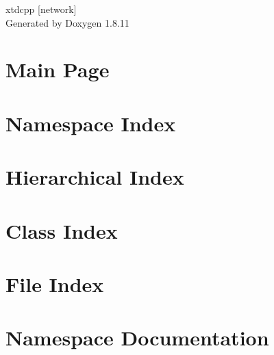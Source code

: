 \documentclass[twoside]{book}
\newcommand{\+}{\discretionary{\mbox{\scriptsize$\hookleftarrow$}}{}{}}
\newcommand{\clearemptydoublepage}{%
  \newpage{\pagestyle{empty}\cleardoublepage}%
}
\begin{document}
\hypersetup{pageanchor=false,
             bookmarksnumbered=true,
             pdfencoding=unicode
            }
\begin{titlepage}
\vspace*{7cm}
\begin{center}%
{\Large xtdcpp \mbox{[}network\mbox{]} }\\
\vspace*{1cm}
{\large Generated by Doxygen 1.8.11}\\
\end{center}
\end{titlepage}
\clearemptydoublepage
\tableofcontents
\clearemptydoublepage
{}
\hypersetup{pageanchor=true}

\chapter{Main Page}
\label{index}\hypertarget{index}{}
\chapter{Namespace Index}

\chapter{Hierarchical Index}

\chapter{Class Index}

\chapter{File Index}

\chapter{Namespace Documentation}








\end{document}
